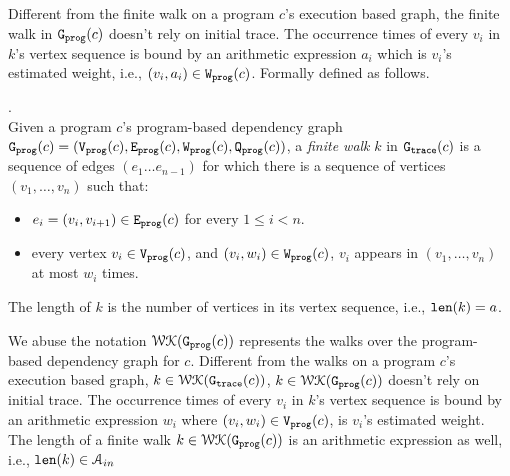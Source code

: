 Different from the finite walk on a program $c$'s execution based graph,
the finite walk in $\mathtt{{G_{prog}}}(c)$ doesn't rely on initial trace.
The occurrence times of every $v_i$ in $k$'s vertex sequence is bound by 
an arithmetic expression $a_i$ which is $v_i$'s estimated weight, i.e., $(v_i, a_i) \in \mathtt{{W_{prog}}}(c)$. 
%
Formally defined as follows.
\begin{defn}.
  \label{def:prog_finitewalk}
  \\
  Given a program $c$'s program-based dependency graph 
  $\mathtt{{G_{prog}}}({c}) = (\mathtt{{V_{prog}}}(c), \mathtt{{E_{prog}}}(c), \mathtt{{W_{prog}}}(c), \mathtt{{Q_{prog}}}(c))$, 
  a \emph{finite walk} $k$ in $\mathtt{{G_{trace}}}({c})$ is
  a sequence of edges $(e_1 \ldots e_{n - 1})$ 
  for which there is a sequence of vertices 
  $(v_1, \ldots, v_{n})$ such that:
  \begin{itemize}
      \item $e_i = (v_{i},v_{i + 1}) \in \mathtt{{E_{prog}}}(c)$ for every $1 \leq i < n$.
      \item every vertex $v_i \in \mathtt{{V_{prog}}}(c)$,
      and $(v_i, w_i) \in \mathtt{{W_{prog}}}(c)$, 
       $v_i$ appears in $(v_1, \ldots, v_{n})$ at most 
    $w_i$
      times.  
  \end{itemize}
  The length of $k$ is the number of vertices in its vertex sequence, i.e., $\mathtt{len}(k) = a$.
 \end{defn}
  We abuse the notation $\mathcal{WK}(\mathtt{{G_{prog}}}(c))$ represents the walks over the program-based dependency graph for $c$.
Different from the walks on a program $c$'s execution based graph,
 $k \in \mathcal{WK}(\mathtt{{G_{trace}}}(c))$, 
$k \in \mathcal{WK}(\mathtt{{G_{prog}}}(c))$ doesn't rely on initial trace.
The occurrence times of every $v_i $ in $k$'s vertex sequence is bound by 
an arithmetic expression $w_i$ where $(v_i, w_i) \in \mathtt{{V_{prog}}}(c)$, is $v_i$'s estimated weight. 
 The length of a finite walk $k \in \mathcal{WK}(\mathtt{{G_{prog}}}(c))$ is an arithmetic expression
 as well, i.e., $\mathtt{len}(k) \in \mathcal{A}_{in}$

